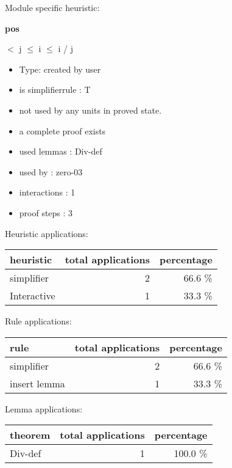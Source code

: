 \documentclass[a4paper]{article}
\begin{document}
Module specific heuristic:

\pagebreak

{\LARGE\bf pos}\label{lemma-pos}

\medskip

  $<$ j  $\le$ i  $\le$ i / j

\begin{itemize}

\item Type: created by user

\item is simplifierrule : T
\item not used by any units in proved state.
\item       a complete proof exists
\item       used lemmas  : Div-def
\item       used by      : zero-03
\item       interactions : 1
\item       proof steps  : 3
\end{itemize}

\medskip


Heuristic applications:

\begin{supertabular}{l|r|r}
heuristic	& total applications & percentage \\ \hline
simplifier & 2 & 66.6 \% \\
Interactive & 1 & 33.3 \% \\

\end{supertabular}

Rule applications:

\begin{supertabular}{l|r|r}
rule	        & total applications & percentage \\ \hline
simplifier & 2 & 66.6 \% \\
insert lemma & 1 & 33.3 \% \\

\end{supertabular}

Lemma applications:

\begin{supertabular}{l|r|r}
theorem	        & total applications & percentage \\ \hline
Div-def & 1 & 100.0 \% \\

\end{supertabular}
\end{document}
